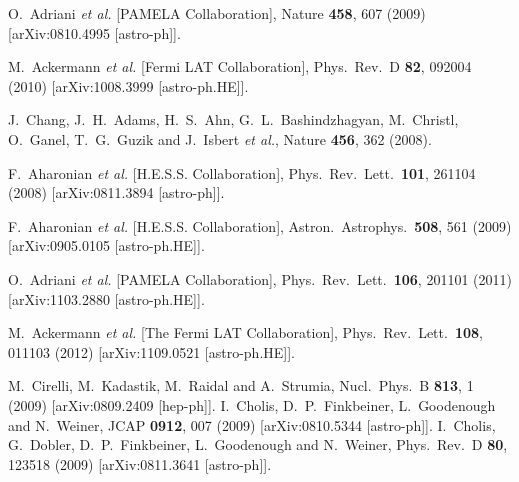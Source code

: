   O.~Adriani {\it et al.}  [PAMELA Collaboration],
  Nature {\bf 458}, 607 (2009)
  [arXiv:0810.4995 [astro-ph]].

  M.~Ackermann {\it et al.}  [Fermi LAT Collaboration],
  Phys.\ Rev.\ D {\bf 82}, 092004 (2010)
  [arXiv:1008.3999 [astro-ph.HE]].

  J.~Chang, J.~H.~Adams, H.~S.~Ahn, G.~L.~Bashindzhagyan, M.~Christl, O.~Ganel, T.~G.~Guzik and J.~Isbert {\it et al.},
  Nature {\bf 456}, 362 (2008).

  F.~Aharonian {\it et al.}  [H.E.S.S. Collaboration],
  Phys.\ Rev.\ Lett.\  {\bf 101}, 261104 (2008)
  [arXiv:0811.3894 [astro-ph]].

  F.~Aharonian {\it et al.}  [H.E.S.S. Collaboration],
  Astron.\ Astrophys.\  {\bf 508}, 561 (2009)
  [arXiv:0905.0105 [astro-ph.HE]].

  O.~Adriani {\it et al.}  [PAMELA Collaboration],
  Phys.\ Rev.\ Lett.\  {\bf 106}, 201101 (2011)
  [arXiv:1103.2880 [astro-ph.HE]].

  M.~Ackermann {\it et al.}  [The Fermi LAT Collaboration],
  Phys.\ Rev.\ Lett.\  {\bf 108}, 011103 (2012)
  [arXiv:1109.0521 [astro-ph.HE]].

  M.~Cirelli, M.~Kadastik, M.~Raidal and A.~Strumia,
  Nucl.\ Phys.\ B {\bf 813}, 1 (2009)
  [arXiv:0809.2409 [hep-ph]].
  I.~Cholis, D.~P.~Finkbeiner, L.~Goodenough and N.~Weiner,
  JCAP {\bf 0912}, 007 (2009)
  [arXiv:0810.5344 [astro-ph]].
  I.~Cholis, G.~Dobler, D.~P.~Finkbeiner, L.~Goodenough and N.~Weiner,
  Phys.\ Rev.\ D {\bf 80}, 123518 (2009)
  [arXiv:0811.3641 [astro-ph]].

